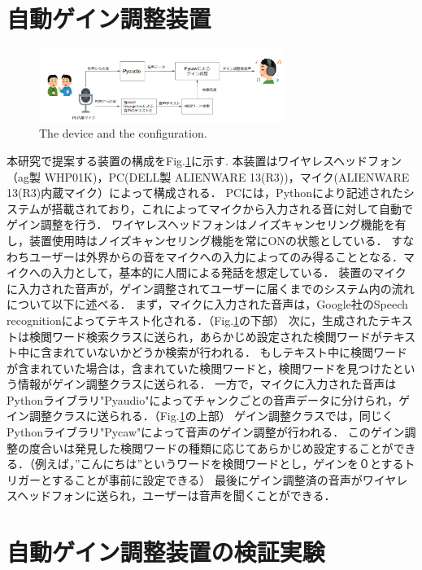 \documentclass[a4paper]{jarticle}
\begin{document}
\section{自動ゲイン調整装置}
\begin{figure}[htbp]
    \begin{center}
    \includegraphics[width=80mm]{system.PNG}
    \caption{The device and the configuration.}
    \label{fig:system}
    \end{center}
    \end{figure}

本研究で提案する装置の構成をFig.\ref{fig:system}に示す.
本装置はワイヤレスヘッドフォン（ag製 WHP01K)，PC(DELL製 ALIENWARE 13(R3))，マイク(ALIENWARE 13(R3)内蔵マイク）によって構成される．
PCには，Pythonにより記述されたシステムが搭載されており，これによってマイクから入力される音に対して自動でゲイン調整を行う．
ワイヤレスヘッドフォンはノイズキャンセリング機能を有し，装置使用時はノイズキャンセリング機能を常にONの状態としている．
すなわちユーザーは外界からの音をマイクへの入力によってのみ得ることとなる．マイクへの入力として，基本的に人間による発話を想定している．
装置のマイクに入力された音声が，ゲイン調整されてユーザーに届くまでのシステム内の流れについて以下に述べる．
まず，マイクに入力された音声は，Google社のSpeech recognitionによってテキスト化される．（Fig.\ref{fig:system}の下部）
次に，生成されたテキストは検閲ワード検索クラスに送られ，あらかじめ設定された検閲ワードがテキスト中に含まれていないかどうか検索が行われる．
もしテキスト中に検閲ワードが含まれていた場合は，含まれていた検閲ワードと，検閲ワードを見つけたという情報がゲイン調整クラスに送られる．
一方で，マイクに入力された音声はPythonライブラリ"Pyaudio"によってチャンクごとの音声データに分けられ，ゲイン調整クラスに送られる．（Fig.\ref{fig:system}の上部）
ゲイン調整クラスでは，同じくPythonライブラリ"Pycaw"によって音声のゲイン調整が行われる．
このゲイン調整の度合いは発見した検閲ワードの種類に応じてあらかじめ設定することができる．（例えば，”こんにちは”というワードを検閲ワードとし，ゲインを０とするトリガーとすることが事前に設定できる）
最後にゲイン調整済の音声がワイヤレスヘッドフォンに送られ，ユーザーは音声を聞くことができる．
\section{自動ゲイン調整装置の検証実験}
\end{document}
